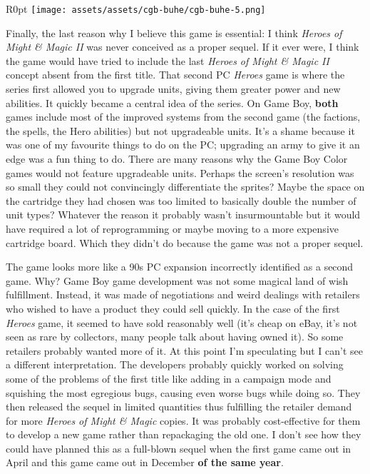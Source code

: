 \documentclass{book}
\begin{document}
\begin{wrapfigure}{R}{0pt} \texttt{[image: assets/assets/cgb-buhe/cgb-buhe-5.png]}\end{wrapfigure}
Finally, the last reason why I believe this game is essential: I think \emph{Heroes of Might \& Magic II} was never conceived as a proper sequel. If it ever were, I think the game would have tried to include the last \emph{Heroes of Might \& Magic II} concept absent from the first title. That second PC \emph{Heroes} game is where the series first allowed you to upgrade units, giving them greater power and new abilities. It quickly became a central idea of the series. On Game Boy, \textbf{both} games include most of the improved systems from the second game (the factions, the spells, the Hero abilities) but not upgradeable units. It’s a shame because it was one of my favourite things to do on the PC; upgrading an army to give it an edge was a fun thing to do. There are many reasons why the Game Boy Color games would not feature upgradeable units. Perhaps the screen’s resolution was so small they could not convincingly differentiate the sprites? Maybe the space on the cartridge they had chosen was too limited to basically double the number of unit types? Whatever the reason it probably wasn’t insurmountable but it would have required a lot of reprogramming or maybe moving to a more expensive cartridge board. Which they didn’t do because the game was not a proper sequel.

The game looks more like a 90s PC expansion incorrectly identified as a second game. Why? Game Boy game development was not some magical land of wish fulfillment. Instead, it was made of negotiations and weird dealings with retailers who wished to have a product they could sell quickly. In the case of the first \emph{Heroes} game, it seemed to have sold reasonably well (it’s cheap on eBay, it’s not seen as rare by collectors, many people talk about having owned it). So some retailers probably wanted more of it. At this point I’m speculating but I can’t see a different interpretation. The developers probably quickly worked on solving some of the problems of the first title like adding in a campaign mode and squishing the most egregious bugs, causing even worse bugs while doing so. They then released the sequel in limited quantities thus fulfilling the retailer demand for more \emph{Heroes of Might \& Magic} copies. It was probably cost-effective for them to develop a new game rather than repackaging the old one. I don’t see how they could have planned this as a full-blown sequel when the first game came out in April and this game came out in December \textbf{of the same year}.
\end{document}
